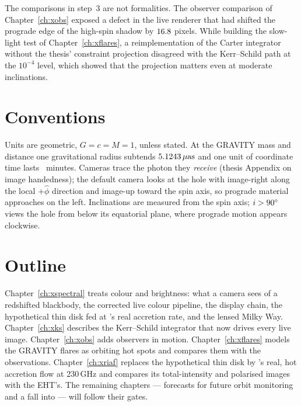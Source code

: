 The comparisons in step~3 are not formalities. The observer comparison of
Chapter~\ref{ch:xobs} exposed a defect in the live renderer that had shifted
the prograde edge of the high-spin shadow by $16.8$ pixels.
While building the slow-light test of Chapter~\ref{ch:xflares}, a
reimplementation of the Carter integrator without the thesis' constraint
projection disagreed with the Kerr--Schild path at the $10^{-4}$ level, which
showed that the projection matters even at moderate inclinations.

\section{Conventions}

Units are geometric, $G = c = M = 1$, unless stated. At the GRAVITY mass and
distance one gravitational radius subtends $5.1243\,\mu\mathrm{as}$ and one unit of
coordinate time lasts \XMinPerM\ minutes. Cameras trace the photon they
\emph{receive} (thesis Appendix on image handedness); the default camera
looks at the hole with image-right along the local $+\hat\phi$ direction and
image-up toward the spin axis, so prograde material approaches on the left.
Inclinations are measured from the spin axis; $i > 90^\circ$ views the hole
from below its equatorial plane, where prograde motion appears clockwise.

\section{Outline}

Chapter~\ref{ch:xspectral} treats colour and brightness: what a camera sees
of a redshifted blackbody, the corrected live colour pipeline, the display
chain, the hypothetical thin disk fed at \sgra's real accretion rate, and the
lensed Milky Way. Chapter~\ref{ch:xks} describes the Kerr--Schild integrator
that now drives every live image. Chapter~\ref{ch:xobs} adds observers in
motion. Chapter~\ref{ch:xflares} models the GRAVITY flares as orbiting hot
spots and compares them with the observations. Chapter~\ref{ch:xriaf}
replaces the hypothetical thin disk by \sgra's real, hot accretion flow at
230\,GHz and compares its total-intensity and polarised images with the
EHT's. The remaining chapters --- forecasts for future orbit monitoring and a
fall into \sgra{} --- will follow their gates.
